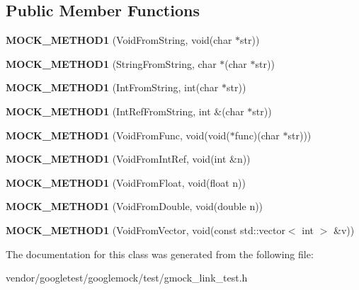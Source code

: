 \subsection*{Public Member Functions}
\begin{DoxyCompactItemize}
\item 
{\bfseries M\+O\+C\+K\+\_\+\+M\+E\+T\+H\+O\+D1} (Void\+From\+String, void(char $\ast$str))\hypertarget{classMock_ada59eea6991953353f332e3ea1e74444}{}\label{classMock_ada59eea6991953353f332e3ea1e74444}

\item 
{\bfseries M\+O\+C\+K\+\_\+\+M\+E\+T\+H\+O\+D1} (String\+From\+String, char $\ast$(char $\ast$str))\hypertarget{classMock_a2db4d82b6f92b4e462929f651ac4c3b1}{}\label{classMock_a2db4d82b6f92b4e462929f651ac4c3b1}

\item 
{\bfseries M\+O\+C\+K\+\_\+\+M\+E\+T\+H\+O\+D1} (Int\+From\+String, int(char $\ast$str))\hypertarget{classMock_ae73b4ee90bf6d84205d2b1c17f0b8433}{}\label{classMock_ae73b4ee90bf6d84205d2b1c17f0b8433}

\item 
{\bfseries M\+O\+C\+K\+\_\+\+M\+E\+T\+H\+O\+D1} (Int\+Ref\+From\+String, int \&(char $\ast$str))\hypertarget{classMock_a2cece30a3ea92b34f612f8032fe3a0f9}{}\label{classMock_a2cece30a3ea92b34f612f8032fe3a0f9}

\item 
{\bfseries M\+O\+C\+K\+\_\+\+M\+E\+T\+H\+O\+D1} (Void\+From\+Func, void(void($\ast$func)(char $\ast$str)))\hypertarget{classMock_ac70c052254fa9816bd759c006062dc47}{}\label{classMock_ac70c052254fa9816bd759c006062dc47}

\item 
{\bfseries M\+O\+C\+K\+\_\+\+M\+E\+T\+H\+O\+D1} (Void\+From\+Int\+Ref, void(int \&n))\hypertarget{classMock_ae2379efbc030f1adf8b032be3bdf081d}{}\label{classMock_ae2379efbc030f1adf8b032be3bdf081d}

\item 
{\bfseries M\+O\+C\+K\+\_\+\+M\+E\+T\+H\+O\+D1} (Void\+From\+Float, void(float n))\hypertarget{classMock_a3fd62026610c5d3d3aeaaf2ade3e18aa}{}\label{classMock_a3fd62026610c5d3d3aeaaf2ade3e18aa}

\item 
{\bfseries M\+O\+C\+K\+\_\+\+M\+E\+T\+H\+O\+D1} (Void\+From\+Double, void(double n))\hypertarget{classMock_a890668928abcd28d4d39df164e7b6dd8}{}\label{classMock_a890668928abcd28d4d39df164e7b6dd8}

\item 
{\bfseries M\+O\+C\+K\+\_\+\+M\+E\+T\+H\+O\+D1} (Void\+From\+Vector, void(const std\+::vector$<$ int $>$ \&v))\hypertarget{classMock_a50e2bda4375a59bb89fd5652bd33eb0f}{}\label{classMock_a50e2bda4375a59bb89fd5652bd33eb0f}

\end{DoxyCompactItemize}


The documentation for this class was generated from the following file\+:\begin{DoxyCompactItemize}
\item 
vendor/googletest/googlemock/test/gmock\+\_\+link\+\_\+test.\+h\end{DoxyCompactItemize}
